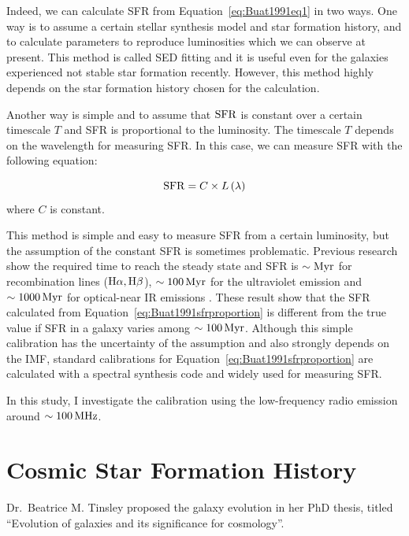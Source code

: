 Indeed, we can calculate SFR from Equation~\ref{eq:Buat1991eq1} in two ways.
One way is to assume a certain stellar synthesis model and star formation history, and to calculate parameters to reproduce luminosities which we can observe at present.
This method is called SED fitting and it is useful even for the galaxies experienced not stable star formation recently.
However, this method highly depends on the star formation history chosen for the calculation.

Another way is simple and to assume that $\mathrm{SFR}$ is constant over a certain timescale $T$ and SFR is proportional to the luminosity.
The timescale $T$ depends on the wavelength for measuring SFR\@.
In this case, we can measure SFR with the following equation:

\begin{equation}\label{eq:Buat1991sfrproportion}
    \mathrm{SFR} = C \times L\left(\lambda\right)
\end{equation}
where $C$ is constant.

This method is simple and easy to measure SFR from a certain luminosity, but the assumption of the constant SFR is sometimes problematic.
Previous research show the required time to reach the steady state and SFR is $\sim\mathrm{Myr}$ for recombination lines ($\mathrm{H\alpha}, \mathrm{H\beta}$), $\sim 100\,\mathrm{Myr}$ for the ultraviolet emission and $\sim 1000\,\mathrm{Myr}$ for optical-near IR emissions \citep{Kennicutt1998, Kennicutt2012}.
These result show that the SFR calculated from Equation~\ref{eq:Buat1991sfrproportion} is different from the true value if SFR in a galaxy varies among $\sim 100\,\mathrm{Myr}$.
Although this simple calibration has the uncertainty of the assumption and also strongly depends on the IMF, standard calibrations for Equation~\ref{eq:Buat1991sfrproportion} are calculated with a spectral synthesis code and widely used for measuring SFR\@.


In this study, I investigate the calibration using the low-frequency radio emission around $\sim 100\,\mathrm{MHz}$.





\section{Cosmic Star Formation History}

Dr.\ Beatrice M. Tinsley proposed the galaxy evolution in her PhD thesis, titled ``Evolution of galaxies and its significance for cosmology''.

